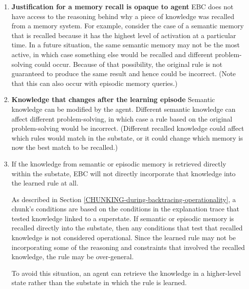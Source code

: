 \begin{enumerate}
	\item \textbf{Justification for a memory recall is opaque to agent} \newline
	EBC does not have access to the reasoning behind why a piece of knowledge was recalled from a memory system.  For example, consider the case of a semantic memory that is recalled because it has the highest level of activation at a particular time.  In a future situation, the same semantic memory may not be the most active, in which case something else would be recalled and different problem-solving could occur.  Because of that possibility, the original rule is not guaranteed to produce the same result and hence could be incorrect.  (Note that this can also occur with episodic memory queries.)

	\item \textbf{Knowledge that changes after the learning episode} \newline
	Semantic knowledge can be modified by the agent.  Different semantic knowledge can affect different problem-solving, in which case a rule based on the original problem-solving would be incorrect.  (Different recalled knowledge could affect which rules would match in the substate, or it could change which memory is now the best match to be recalled.)

	\item If the knowledge from semantic or episodic memory is retrieved directly within the substate, EBC will not directly incorporate that knowledge into the learned rule at all.
	
	As described in Section \ref{CHUNKING-during-backtracing-operationality}, a chunk's conditions are based on the conditions in the explanation trace that tested knowledge linked to a superstate.  If semantic or episodic memory is recalled directly into the substate, then any conditions that test that recalled knowledge is not considered operational.  Since the learned rule may not be incorporating some of the reasoning and constraints that involved the recalled knowledge, the rule may be over-general.

	To avoid this situation, an agent can retrieve the knowledge in a higher-level state rather than the substate in which the rule is learned.

\end{enumerate}


